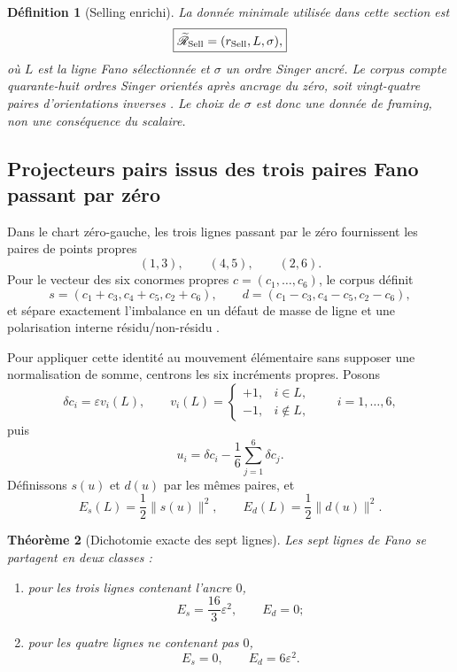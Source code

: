 \documentclass[11pt,a4paper]{article}
\newtheorem{theorem}{Théorème}[section]
\newtheorem{definition}[theorem]{Définition}
\begin{document}
\begin{definition}[Selling enrichi]\label{def:v12-enriched-selling}
La donnée minimale utilisée dans cette section est
\begin{equation}\label{eq:v12-enriched-selling}
 \boxed{
 \widetilde{\mathscr R}_{\rm Sell}
 =
 (r_{\rm Sell},L,\sigma),}
\end{equation}
où $L$ est la ligne Fano sélectionnée et $\sigma$ un ordre Singer ancré. Le corpus compte quarante-huit ordres Singer orientés après ancrage du zéro, soit vingt-quatre paires d'orientations inverses \cite{Selling43}. Le choix de $\sigma$ est donc une donnée de framing, non une conséquence du scalaire.
\end{definition}

\subsection{Projecteurs pairs issus des trois paires Fano passant par zéro}

Dans le chart zéro-gauche, les trois lignes passant par le zéro fournissent les paires de points propres
\[
 (1,3),\qquad(4,5),\qquad(2,6).
\]
Pour le vecteur des six conormes propres $c=(c_1,\ldots,c_6)$, le corpus définit
\[
 s=(c_1+c_3,c_4+c_5,c_2+c_6),
 \qquad
 d=(c_1-c_3,c_4-c_5,c_2-c_6),
\]
et sépare exactement l'imbalance en un défaut de masse de ligne et une polarisation interne résidu/non-résidu \cite{Selling43}.

Pour appliquer cette identité au mouvement élémentaire sans supposer une normalisation de somme, centrons les six incréments propres. Posons
\[
 \delta c_i=\varepsilon v_i(L),\qquad
 v_i(L)=
 \begin{cases}
 +1,&i\in L,\\
 -1,&i\notin L,
 \end{cases}
 \qquad i=1,\ldots,6,
\]
puis
\[
 u_i=\delta c_i-\frac16\sum_{j=1}^6\delta c_j.
\]
Définissons $s(u)$ et $d(u)$ par les mêmes paires, et
\begin{equation}\label{eq:v12-even-energies}
 E_s(L)=\frac12\|s(u)\|^2,
 \qquad
 E_d(L)=\frac12\|d(u)\|^2.
\end{equation}

\begin{theorem}[Dichotomie exacte des sept lignes]\label{thm:v12-line-dichotomy}
Les sept lignes de Fano se partagent en deux classes :
\begin{enumerate}[label=\textup{(\roman*)}]
\item pour les trois lignes contenant l'ancre $0$,
\[
 \boxed{
 E_s=\frac{16}{3}\varepsilon^2,\qquad E_d=0;}
\]
\item pour les quatre lignes ne contenant pas $0$,
\[
 \boxed{
 E_s=0,\qquad E_d=6\varepsilon^2.}
\]
\end{enumerate}
\end{theorem}
\end{document}
